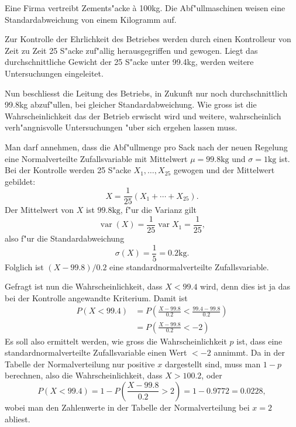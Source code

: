Eine Firma vertreibt Zements"acke \`a 100kg. Die Abf"ullmaschinen weisen
eine Standardabweichung von einem Kilogramm auf.

Zur Kontrolle der Ehrlichkeit des Betriebes werden durch einen Kontrolleur
von Zeit zu Zeit 25 S"acke zuf"allig herausgegriffen und gewogen. Liegt
das durchschnittliche Gewicht der 25 S"acke unter 99.4kg, werden weitere
Untersuchungen eingeleitet.

Nun beschliesst die Leitung des Betriebs, in Zukunft nur noch durchschnittlich
99.8kg abzuf"ullen, bei gleicher Standardabweichung. Wie gross ist die
Wahrscheinlichkeit das der Betrieb erwischt wird und weitere, wahrscheinlich
verh"angnisvolle Untersuchungen "uber sich ergehen lassen muss.

\begin{loesung}
Man darf annehmen, dass die Abf"ullmenge pro Sack nach der neuen Regelung
eine Normalverteilte Zufallsvariable mit Mittelwert $\mu=99.8\text{kg}$ und
$\sigma=1\text{kg}$ ist. Bei der Kontrolle werden 25 S"acke $X_1,\dots,X_{25}$
gewogen und der Mittelwert gebildet:
\[
X=\frac1{25}(X_1+\cdots +X_{25}).
\]
Der Mittelwert von $X$ ist $99.8\text{kg}$, f"ur die Varianz gilt
\[
\operatorname{var}(X)=\frac1{25}\operatorname{var}{X_1}=\frac1{25},
\]
also f"ur die Standardabweichung
\[
\sigma(X)=\frac15=0.2\text{kg}.
\]
Folglich ist $(X-99.8)/0.2$ eine standardnormalverteilte Zufallsvariable.

Gefragt ist nun die Wahrscheinlichkeit, dass $X<99.4$ wird, denn dies ist ja
das bei der Kontrolle angewandte Kriterium. Damit ist
\begin{align*}
P(X<99.4)
&=P\left(\frac{X-99.8}{0.2} < \frac{99.4-99.8}{0.2}\right)\\
&=P\left(\frac{X-99.8}{0.2} < -2\right)
\end{align*}
Es soll also ermittelt werden, wie gross die Wahrscheinlichkeit $p$ ist, dass
eine standardnormalverteilte Zufallsvariable einen Wert $<-2$ annimmt.
Da in der Tabelle der Normalverteilung nur positive $x$ dargestellt sind,
muss man $1-p$ berechnen, also die Wahrscheinlichkeit, dass $X>100.2$,
oder
\[
P(X<99.4)=1-P\left(\frac{X-99.8}{0.2}>2\right)
=1-0.9772=0.0228,
\]
wobei man den Zahlenwerte in der Tabelle der Normalverteilung bei $x=2$ abliest.
\end{loesung}

